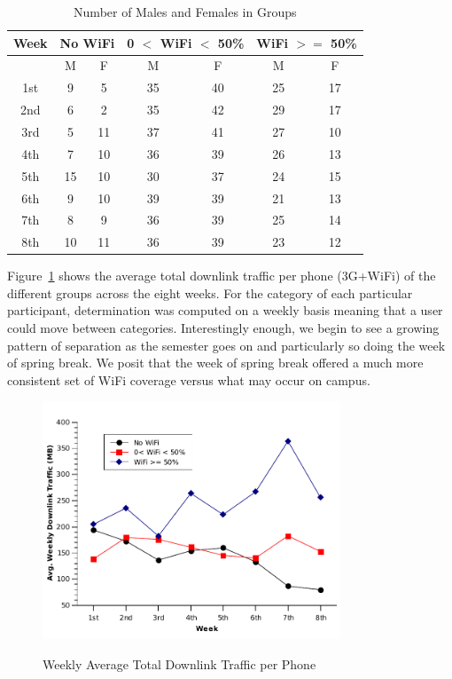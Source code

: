 \begin{table}[h!tbp] 
\caption{Number of Males and Females in Groups} 
\label{table:gender}
\centering 
\begin{tabular}{|c|cc|cc|cc|}
\hline
Week &  \multicolumn{2}{c}{No WiFi} & \multicolumn{2}{|c|}{0 $<$ WiFi $<$ 50\%} & \multicolumn{2}{c|}{WiFi $>=$ 50\%} \\
\hline
& M & F & M & F &   M & F \\
\hline
 \parbox[t]{3cm}{\hspace{12mm}1st}& 9&5&35&40&25&17\\ 
\hline
2nd &6&2	&35&42&29&17\\
\hline
3rd&5&11&37&41&27&10\\
\hline
4th&7&10&36&39&26&13\\
\hline
5th&15&10&30&37&24&15\\
\hline
6th&9&10&39&39&21&13\\
\hline
7th&8&9&36&39&25	&14\\
\hline
8th&10&11&36&39&23&12\\
\hline
\end{tabular}
\end{table}

Figure~\ref{fig:downlink} shows the average total downlink traffic per phone (3G+WiFi) of the different groups across the eight weeks. For the category of each particular participant, determination was computed on a weekly basis meaning that a user could move between categories. Interestingly enough, we begin to see a growing pattern of separation as the semester goes on and particularly so doing the week of spring 
break. We posit that the week of spring break offered a much more consistent set of WiFi coverage versus what may occur on campus.   

\begin{figure}[h!tbp]
\centering
{\includegraphics[width = 3.5in]{graphs/downlink.pdf}}
\caption{Weekly Average Total Downlink Traffic per Phone} 
\label{fig:downlink}
\end{figure}

